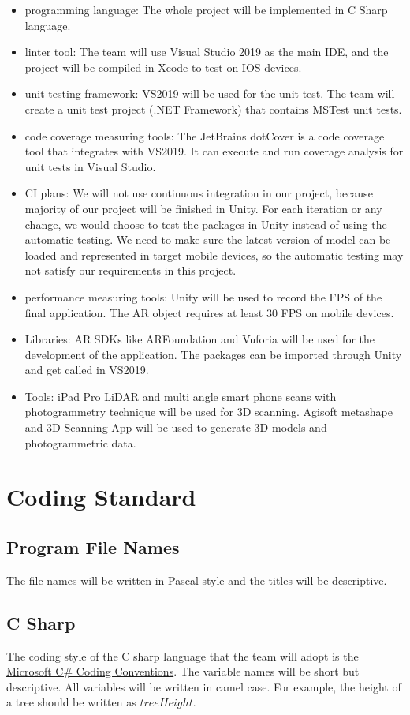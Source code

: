 \documentclass{article}
\begin{document}
\begin{itemize}
\item programming language: The whole project will be implemented in C Sharp language.
\item linter tool: The team will use Visual Studio 2019 as the main IDE, and the project will be compiled in Xcode to test on IOS devices.
\item unit testing framework: VS2019 will be used for the unit test. The team will create a unit test project (.NET Framework) that contains MSTest unit tests.
\item code coverage measuring tools: The JetBrains dotCover is a code coverage tool that integrates with VS2019. It can execute and run coverage analysis for unit tests in Visual Studio.
\item CI plans: We will not use continuous integration in our project, because majority of our project will be finished in Unity. For each iteration or any change, we would choose to test the packages in Unity instead of using the automatic testing. We need to make sure the latest version of model can be loaded and represented in target mobile devices, so the automatic testing may not satisfy our requirements in this project.
\item performance measuring tools: Unity will be used to record the FPS of the final application. The AR object requires at least 30 FPS on mobile devices.
\item Libraries: AR SDKs like ARFoundation and Vuforia will be used for the development of the application. The packages can be imported through Unity and get called in VS2019.
\item Tools: iPad Pro LiDAR and multi angle smart phone scans with photogrammetry technique will be used for 3D scanning. Agisoft metashape and 3D Scanning App will be used to generate 3D models and photogrammetric data.
\end{itemize}

\section{Coding Standard}
\subsection{Program File Names}
The file names will be written in Pascal style and the titles will be descriptive.

\subsection{C Sharp}
The coding style of the C sharp language that the team will adopt is the \href{https://learn.microsoft.com/en-us/dotnet/csharp/fundamentals/coding-style/coding-conventions}{Microsoft C\# Coding Conventions}. The variable names will be short but descriptive. All variables will be written in camel case. For example, the height of a tree should be written as $treeHeight$.
\end{document}
